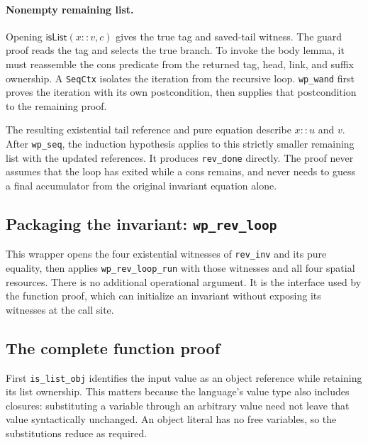 \documentclass[11pt]{article}
\begin{document}
\paragraph{Nonempty remaining list.}
Opening \(\mathsf{isList}(x::v,c)\) gives the true tag and saved-tail witness.
The guard proof reads the tag and selects the true branch. To invoke the body
lemma, it must reassemble the cons predicate from the returned tag, head,
link, and suffix ownership. A \texttt{SeqCtx} isolates the iteration from the
recursive loop. \texttt{wp\_wand} first proves the iteration with its own
postcondition, then supplies that postcondition to the remaining proof.

The resulting existential tail reference and pure equation describe
\(x::u\) and \(v\). After \texttt{wp\_seq}, the induction hypothesis applies to
this strictly smaller remaining list with the updated references. It produces
\texttt{rev\_done} directly. The proof never assumes that the loop has exited
while a cons remains, and never needs to guess a final accumulator from the
original invariant equation alone.

\subsection{Packaging the invariant: \texttt{wp\_rev\_loop}}

\begin{minipage}{\linewidth}

\end{minipage}

This wrapper opens the four existential witnesses of \texttt{rev\_inv} and
its pure equality, then applies \texttt{wp\_rev\_loop\_run} with those witnesses
and all four spatial resources. There is no additional operational argument.
It is the interface used by the function proof, which can initialize an
invariant without exposing its witnesses at the call site.

\subsection{The complete function proof}



First \texttt{is\_list\_obj} identifies the input value as an object reference
while retaining its list ownership. This matters because the language's value
type also includes closures: substituting a variable through an arbitrary
value need not leave that value syntactically unchanged. An object literal has
no free variables, so the substitutions reduce as required.
\end{document}
